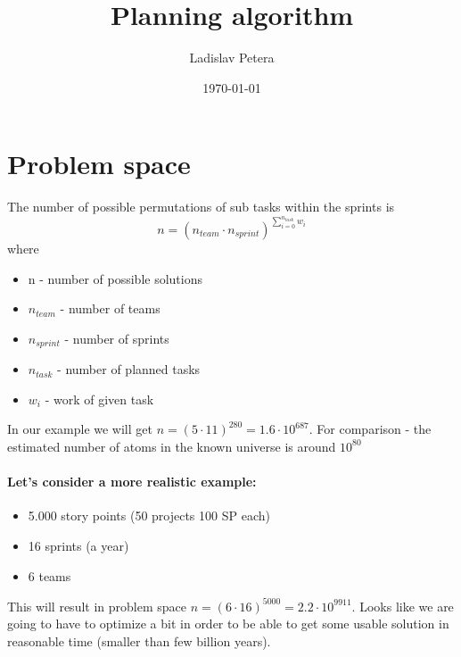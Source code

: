 \documentclass[10pt,a4paper]{article}
\title{Planning algorithm}
\author{Ladislav Petera}
\date{\today}
\begin{document}
\maketitle

\section{Problem space}

The number of possible permutations of sub tasks within the sprints is
$$n = (n_{team} \cdot n_{sprint}) ^{\sum_{i=0}^{n_{task}}{w_i}} $$ where
\begin{itemize}
\item n - number of possible solutions
\item $n_{team}$ - number of teams
\item $n_{sprint}$ - number of sprints
\item $n_{task}$ - number of planned tasks
\item $w_i$ - work of given task
\end{itemize}

In our example we will get $n = (5 \cdot 11) ^{280} = 1.6 \cdot 10^{687}$.
For comparison - the estimated number of atoms in the known universe is around $10^{80}$

\paragraph{Let's consider a more realistic example:}

\begin{itemize}
\item 5.000 story points (50 projects 100 SP each)
\item 16 sprints (a year)
\item 6 teams
\end{itemize}

This will result in problem space $n = (6 \cdot 16) ^{5000} = 2.2 \cdot 10^{9911}$.
Looks like we are going to have to optimize a bit in order to be able to get some usable solution in reasonable time (smaller than few billion years).
\end{document}
